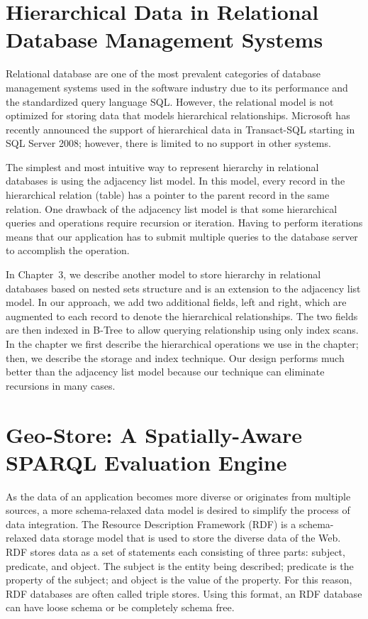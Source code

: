 \section{Hierarchical Data in Relational Database Management Systems}

Relational database are one of the most prevalent categories of database management systems used in the software industry due to its performance and the standardized query language SQL. However, the relational model is not optimized for storing data that models hierarchical relationships. Microsoft has recently announced the support of hierarchical data in Transact-SQL starting in SQL Server 2008\cite{expert_sql_server}; however, there is limited to no support in other systems.

The simplest and most intuitive way to represent hierarchy in relational databases is using the adjacency list model. In this model, every record in the hierarchical relation (table) has a pointer to the parent record in the same relation. One drawback of the adjacency list model is that some hierarchical queries and operations require recursion or iteration. Having to perform iterations means that our application has to submit multiple queries to the database server to accomplish the operation.

In Chapter~3, we describe another model to store hierarchy in relational databases based on nested sets structure and is an extension to the adjacency list model. In our approach, we add two additional fields, left and right, which are augmented to each record to denote the hierarchical relationships. The two fields are then indexed in B-Tree to allow querying relationship using only index scans. In the chapter we first describe the hierarchical operations we use in the chapter; then, we describe the storage and index technique. Our design performs much better than the adjacency list model because our technique can eliminate recursions in many cases.

\section{Geo-Store: A Spatially-Aware SPARQL Evaluation Engine}

As the data of an application becomes more diverse or originates from multiple sources, a more schema-relaxed data model is desired to simplify the process of data integration. The Resource Description Framework (RDF) is a schema-relaxed data storage model that is used to store the diverse data of the Web. RDF stores data as a set of statements each consisting of three parts: subject, predicate, and object. The subject is the entity being described; predicate is the property of the subject; and object is the value of the property. For this reason, RDF databases are often called triple stores. Using this format, an RDF database can have loose schema or be completely schema free.

